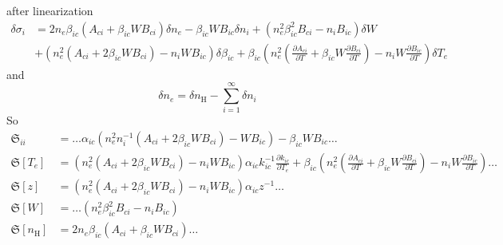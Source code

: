 \documentclass{article}
\begin{document}
after linearization
\begin{equation}
    \begin{aligned}
        \delta\sigma_i &= 2n_e\beta_{ic}(A_{ci} + \beta_{ic}WB_{ci})\delta n_e - \beta_{ic}WB_{ic}\delta n_i + (n_e^2\beta_{ic}^2B_{ci} - n_iB_{ic})\delta W \\
        &+ (n_e^2(A_{ci} + 2\beta_{ic}WB_{ci}) - n_iWB_{ic})\delta\beta_{ic} + \beta_{ic}\left(n_e^2\left(\frac{\partial A_{ci}}{\partial T} + \beta_{ic}W\frac{\partial B_{ci}}{\partial T}\right) - n_iW\frac{\partial B_{ic}}{\partial T}\right)\delta T_e
    \end{aligned}
\end{equation}
and
\begin{equation}
    \delta n_e = \delta n_\mathrm{H} - \sum\limits_{i=1}^\infty\delta n_i
\end{equation}
So
\begin{equation}
    \begin{aligned}
        \mathfrak{S}_{ii} &= \ldots \alpha_{ic}(n_e^2n_i^{-1}(A_{ci} + 2\beta_{ic}WB_{ci}) - WB_{ic}) - \beta_{ic}WB_{ic}\ldots   \\ 
        \mathfrak{S}[T_e] &= (n_e^2(A_{ci} + 2\beta_{ic}WB_{ci}) - n_iWB_{ic})\alpha_{ic}k_{ic}^{-1}\frac{\partial k_{ic}}{\partial T_e} + \beta_{ic}\left(n_e^2\left(\frac{\partial A_{ci}}{\partial T} + \beta_{ic}W\frac{\partial B_{ci}}{\partial T}\right) - n_iW\frac{\partial B_{ic}}{\partial T}\right) \ldots\\
        \mathfrak{S}[z] &= (n_e^2(A_{ci} + 2\beta_{ic}WB_{ci}) - n_iWB_{ic})\alpha_{ic}z^{-1} \ldots\\
        \mathfrak{S}[W] &= \ldots (n_e^2\beta_{ic}^2B_{ci} - n_iB_{ic})\\
        \mathfrak{S}[n_\mathrm{H}] &= 2n_e\beta_{ic}(A_{ci} + \beta_{ic}WB_{ci})\ldots
    \end{aligned}
\end{equation}
\end{document}
